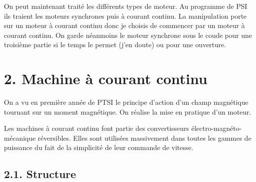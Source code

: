 \documentclass[french, a4paper, 10pt, twocolumn, landscape]{article}
\begin{document}
On peut maintenant traité les différents types de moteur. Au programme de PSI ils traient les moteurs synchrones puis à courant continu. La manipulation porte sur un moteur à courant continu donc je choisis de commencer par un moteur à courant continu. On garde néanmoins le moteur synchrone sous le coude pour une troisième partie si le temps le permet (j'en doute) ou pour une ouverture.


\section*{2. Machine à courant continu}
On a vu en première année de PTSI le principe d'action d'un champ magnétique tournant sur un moment magnétique. On réalise la mise en pratique d'un moteur.\medskip

Les machines à courant continu font partie des convertisseurs électro-magnéto-mécanique réversibles. Elles sont utilisées massivement dans toutes les gammes de puissance du fait de la simplicité de leur commande de vitesse.

\subsection*{2.1. Structure}
\end{document}
